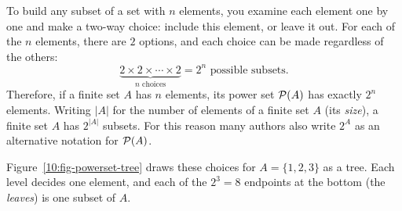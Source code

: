 To build any subset of a set with $n$ elements, you examine each element one by one and make a two-way choice: include this element, or leave it out. For each of the $n$ elements, there are $2$ options, and each choice can be made regardless of the others:
\[
\underbrace{2 \times 2 \times \cdots \times 2}_{n \text{ choices}} = 2^n \text{ possible subsets}.
\]
Therefore, if a finite set $A$ has $n$ elements, its power set $\mathcal{P}(A)$ has exactly $2^n$ elements. Writing $|A|$ for the number of elements of a finite set $A$ (its \emph{size}), a finite set $A$ has $2^{|A|}$ subsets. For this reason many authors also write $2^A$ as an alternative notation for $\mathcal{P}(A)$.

Figure~\ref{10:fig-powerset-tree} draws these choices for $A = \{1, 2, 3\}$ as a tree. Each level decides one element, and each of the $2^3 = 8$ endpoints at the bottom (the \emph{leaves}) is one subset of $A$.

